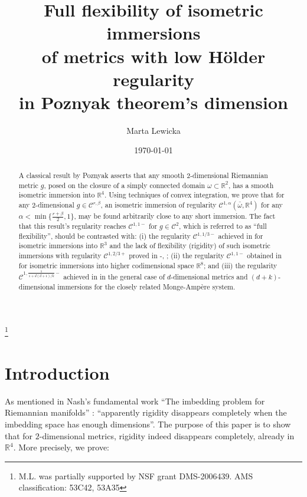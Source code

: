 \documentclass[reqno,twoside,11pt]{amsart}
\newcommand{\R}{\mathbb{R}}
\numberwithin{equation}{section}
\theoremstyle{plain}
\theoremstyle{definition}
\begin{document}
\title [Full flexibility of Poznyak's theorem]
{Full flexibility of isometric immersions \\ of metrics with low H\"older
  regularity \\  in Poznyak theorem's dimension}
\author{Marta Lewicka}
\address{M.L.: University of Pittsburgh, Department of Mathematics, 
139 University Place, Pittsburgh, PA 15260}

\date{\today}
\thanks{M.L. was partially supported by NSF grant DMS-2006439.
AMS classification: 53C42, 53A35}

\begin{abstract}
A classical result by Poznyak asserts that any smooth $2$-dimensional
Riemannian metric $g$, posed on the closure of a
simply connected domain $\omega\subset\R^2$, has
a smooth isometric immersion into $\R^4$. Using techniques of convex
integration, we prove that for any $2$-dimensional
$g\in\mathcal{C}^{r,\beta}$, an isometric immersion of regularity 
$\mathcal{C}^{1,\alpha}(\bar\omega,\R^4)$ for any
$\alpha<\min\{\frac{r+\beta}{2},1\}$, may be found arbitrarily close
to any short immersion.
The fact that this result's regularity reaches $\mathcal{C}^{1,1-}$ for $g\in
\mathcal{C}^2$, which is referred to as ``full flexibility'',
should be contrasted with: (i)  the regularity 
$\mathcal{C}^{1,1/3-}$ achieved in \cite{CHI2} for isometric
immersions into $\R^{3}$ and the lack of flexibility (rigidity)
of such isometric immersions with regularity
$\mathcal{C}^{1, 2/3+}$ proved in \cite{Bor1}-\cite{Bor5},
\cite{CDS}; (ii) the regularity $\mathcal{C}^{1,1-}$
obtained in \cite{Kallen} for isometric immersions into higher
codimensional space $\R^{8}$; and (iii) the regularity
$\mathcal{C}^{1,\frac{1}{1+d(d+1)/k}-}$ achieved in 
\cite{lew_conv} in the general case of $d$-dimensional metrics and
$(d+k)$-dimensional immersions for the closely related Monge-Amp\`ere system.
\end{abstract}

\maketitle
\tableofcontents

\section{Introduction}

As mentioned in Nash's fundamental work ``The imbedding problem for
Riemannian manifolds'' \cite{Nash1}:
``apparently rigidity disappears completely when the imbedding space
has enough dimensions''. The purpose of
this paper is to show that for $2$-dimensional metrics, 
rigidity indeed disappears completely, already in $\R^4$. More precisely, we prove:
\end{document}
